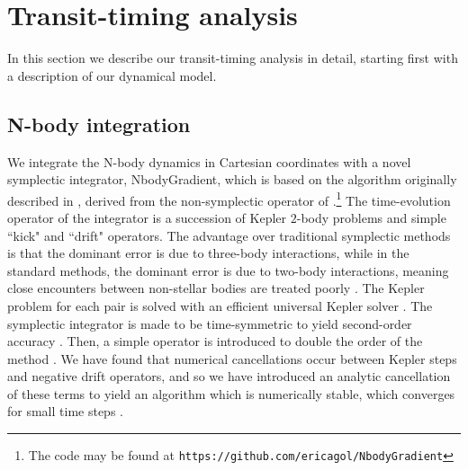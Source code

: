 \documentclass[twocolumn]{aastex63}
\begin{document}
\section{Transit-timing analysis} \label{sec:transit_timing}

In this section we describe our transit-timing analysis in detail, starting first with a description of our dynamical model.




\subsection{N-body integration}

We integrate the N-body dynamics in Cartesian coordinates with a novel symplectic
integrator, \textsf{NbodyGradient}, which is based on the algorithm originally described in \cite{Hernandez2015}, derived from the non-symplectic operator of \cite{GoncalvesFerrari2014}.\footnote{The code may be found at
    \texttt{https://github.com/ericagol/NbodyGradient}}  The time-evolution operator of the integrator is a succession of Kepler $2$-body problems and simple ``kick" and ``drift" operators.  %
The advantage over traditional symplectic methods \citep{Wisdom1991} is that the dominant error is due to three-body interactions, while in the standard methods, the dominant error is due to two-body interactions, meaning close encounters between non-stellar bodies are treated poorly \citep{Hernandez2017}.    The Kepler problem
for each pair is solved with an efficient universal Kepler solver \citep{Wisdom2015}.
The symplectic integrator is made to be time-symmetric to yield second-order
accuracy \citep{Hernandez2015}.  Then, a simple operator is introduced to double the order of the method \citep{Dehnen2017}.
We have found that numerical cancellations occur between Kepler steps
and negative drift operators, and so we have introduced an analytic cancellation
of these terms to yield an algorithm which is numerically stable,
which converges for small time steps \citep{Agol2020}.
\end{document}
